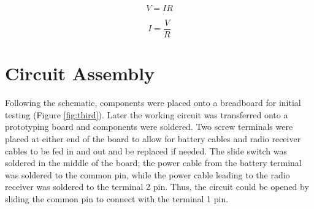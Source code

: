 \documentclass[journal]{IEEEtran}
\begin{document}
\begin{equation}
V = IR
\label{eq:ohmslaw1}
\end{equation}

\begin{equation}
I = \frac{V}{R}
\label{eq:ohmslaw2}
\end{equation}


\smallskip
\section{Circuit Assembly}

\noindent Following the schematic, components were placed onto a breadboard for initial testing (Figure \ref{fig:third}). Later the working circuit was transferred onto a prototyping board and components were soldered. Two screw terminals were placed at either end of the board to allow for battery cables and radio receiver cables to be fed in and out and be replaced if needed. The slide switch was soldered in the middle of the board; the power cable from the battery terminal was soldered to the common pin, while the power cable leading to the radio receiver was soldered to the terminal 2 pin. Thus, the circuit could be opened by sliding the common pin to connect with the terminal 1 pin.\\
\end{document}
